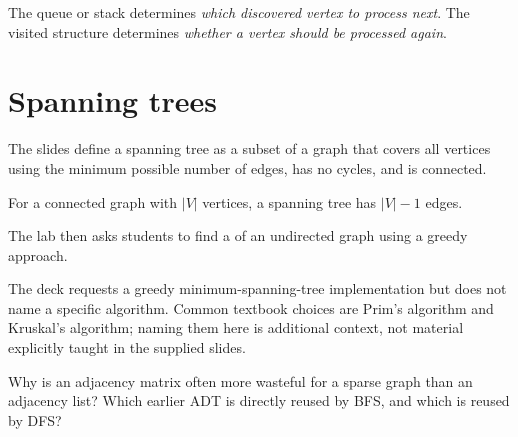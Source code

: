 \begin{keyidea}
The queue or stack determines \emph{which discovered vertex to process next}. The visited structure determines \emph{whether a vertex should be processed again}.
\end{keyidea}

\section{Spanning trees}

The slides define a spanning tree as a subset of a graph that covers all vertices using the minimum possible number of edges, has no cycles, and is connected.

For a connected graph with $|V|$ vertices, a spanning tree has $|V|-1$ edges.

The lab then asks students to find a  of an undirected graph using a greedy approach.

\begin{clarification}
The deck requests a greedy minimum-spanning-tree implementation but does not name a specific algorithm. Common textbook choices are Prim's algorithm and Kruskal's algorithm; naming them here is additional context, not material explicitly taught in the supplied slides.
\end{clarification}

\begin{quickcheck}
Why is an adjacency matrix often more wasteful for a sparse graph than an adjacency list? Which earlier ADT is directly reused by BFS, and which is reused by DFS?
\end{quickcheck}
